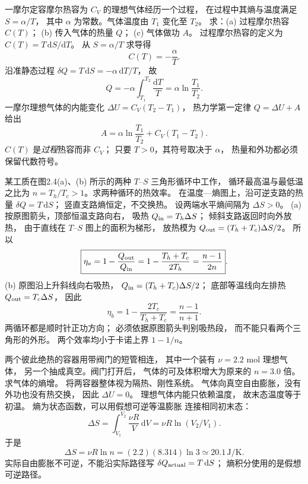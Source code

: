 一摩尔定容摩尔热容为 $C_V$ 的理想气体经历一个过程，
在过程中其熵与温度满足 $S=\alpha/T$，
其中 $\alpha$ 为常数。气体温度由 $T_1$ 变化至 $T_2$。
求：(a) 过程摩尔热容 $C(T)$；
(b) 传入气体的热量 $Q$；
(c) 气体做功 $A$。
\exsolution
过程摩尔热容的定义为
$C(T)=T\,\mathrm dS/\mathrm dT$。
从 $S=\alpha/T$ 求导得
\[
\boxed{C(T)=-\frac{\alpha}{T}}.
\]
沿准静态过程
$\delta Q=T\,\mathrm dS=-\alpha\,\mathrm dT/T$，
故
\[
\boxed{Q=-\alpha\int_{T_1}^{T_2}\frac{\mathrm dT}{T}
=\alpha\ln\frac{T_1}{T_2}}.
\]
一摩尔理想气体的内能变化
$\Delta U=C_V(T_2-T_1)$，
热力学第一定律 $Q=\Delta U+A$ 给出
\[
\boxed{A=\alpha\ln\frac{T_1}{T_2}
+C_V(T_1-T_2)}.
\]
\excheck $C(T)$ 是\emph{过程}热容而非 $C_V$；
只要 $T>0$，其符号取决于 $\alpha$，
热量和外功都必须保留代数符号。

某工质在图2.4(a)、(b) 所示的两种
$T$--$S$ 三角形循环中工作，
循环最高温与最低温之比为
$n=T_h/T_c>1$。求两种循环的热效率。
\exsolution
在温度—熵图上，沿可逆支路的热量
$\delta Q=T\,\mathrm dS$；
竖直支路熵恒定，不交换热。
设两端水平熵间隔为 $\Delta S>0$。
(a) 按原图箭头，顶部恒温支路向右，
吸热
$Q_{\rm in}=T_h\Delta S$；
倾斜支路返回时向外放热，
由于直线在 $T$--$S$ 图上的面积为梯形，
放热模为
$Q_{\rm out}=(T_h+T_c)\Delta S/2$。
所以
\[
\boxed{\eta_a=1-\frac{Q_{\rm out}}{Q_{\rm in}}
=1-\frac{T_h+T_c}{2T_h}
=\frac{n-1}{2n}}.
\]
(b) 原图沿上升斜线向右吸热，
$Q_{\rm in}=(T_h+T_c)\Delta S/2$；
底部等温线向左排热
$Q_{\rm out}=T_c\Delta S$，
因此
\[
\boxed{\eta_b=1-\frac{2T_c}{T_h+T_c}
=\frac{n-1}{n+1}}.
\]
\excheck 两循环都是顺时针正功方向；
必须依据原图箭头判别吸热段，
而不能只看两个三角形的外形。
两个效率均小于卡诺上界 $1-1/n$。

两个彼此绝热的容器用带阀门的短管相连，
其中一个装有 $\nu=2.2$ mol 理想气体，
另一个抽成真空。阀门打开后，
气体的可及体积增大为原来的 $n=3.0$ 倍。
求气体的熵增。
\exsolution
将两容器整体视为隔热、刚性系统。
气体向真空自由膨胀，没有外功也没有热交换，
因此 $\Delta U=0$。
理想气体内能只依赖温度，
故末态温度等于初温。
熵为状态函数，可以用假想可逆等温膨胀
连接相同初末态：
\[
\Delta S=\int_{V_1}^{V_2}\frac{\nu R}{V}\,\mathrm dV
=\nu R\ln(V_2/V_1).
\]
于是
\[
\boxed{\Delta S=\nu R\ln n
=(2.2)(8.314)\ln3
\simeq20.1\,\mathrm{J/K}}.
\]
\excheck 实际自由膨胀不可逆，不能沿实际路径写
$\delta Q_{\rm actual}=T\,\mathrm dS$；
熵积分使用的是假想可逆路径。


